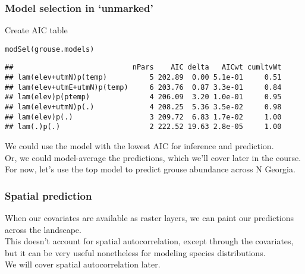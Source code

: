 \documentclass[color=usenames,dvipsnames]{beamer}\usepackage[]{graphicx}\usepackage[]{color}
\makeatletter
\newcommand{\hlstd}[1]{\textcolor[rgb]{0,0,0}{#1}}%
\newcommand{\hlkwd}[1]{\textcolor[rgb]{0.004,0.004,0.506}{#1}}%
\newenvironment{kframe}{%
 \def\at@end@of@kframe{}%
 \ifinner\ifhmode%
  \def\at@end@of@kframe{\end{minipage}}%
  \begin{minipage}{\columnwidth}%
 \fi\fi%
 \def\FrameCommand##1{\hskip\@totalleftmargin \hskip-\fboxsep
 \colorbox{shadecolor}{##1}\hskip-\fboxsep
     \hskip-\linewidth \hskip-\@totalleftmargin \hskip\columnwidth}%
 \MakeFramed {\advance\hsize-\width
   \@totalleftmargin\z@ \linewidth\hsize
   \@setminipage}}%
 {\par\unskip\endMakeFramed%
 \at@end@of@kframe}
\newenvironment{knitrout}{}{} %
\makeatother
\begin{document}
\begin{frame}[fragile]
  \frametitle{Model selection in `unmarked'}
  \small
  Create AIC table
\begin{knitrout}\scriptsize
{}\color{fgcolor}\begin{kframe}
\begin{alltt}
\hlkwd{modSel}\hlstd{(grouse.models)}
\end{alltt}
\begin{verbatim}
##                            nPars    AIC delta   AICwt cumltvWt
## lam(elev+utmN)p(temp)          5 202.89  0.00 5.1e-01     0.51
## lam(elev+utmE+utmN)p(temp)     6 203.76  0.87 3.3e-01     0.84
## lam(elev)p(ptemp)              4 206.09  3.20 1.0e-01     0.95
## lam(elev+utmN)p(.)             4 208.25  5.36 3.5e-02     0.98
## lam(elev)p(.)                  3 209.72  6.83 1.7e-02     1.00
## lam(.)p(.)                     2 222.52 19.63 2.8e-05     1.00
\end{verbatim}
\end{kframe}
\end{knitrout}
  \pause
  \vfill
  We could use the model with the lowest AIC for inference and
  prediction. \\ 
  \pause
  \vfill
  Or, we could model-average the predictions, which we'll cover later
  in the course. \\
  \pause
  \vfill
  For now, let's use the top model to predict grouse abundance across
  N Georgia.
\end{frame}




\begin{frame}
  \frametitle{Spatial prediction}
  When our covariates are available as raster layers, we can paint our
  predictions across the landscape. \\
  \pause
  \vfill
  This doesn't account for spatial autocorrelation, except through the
  covariates, but it can be very useful nonetheless for modeling
  species distributions. \\
  \pause
  \vfill
  We will cover spatial autocorrelation later. 
\end{frame}
\end{document}
